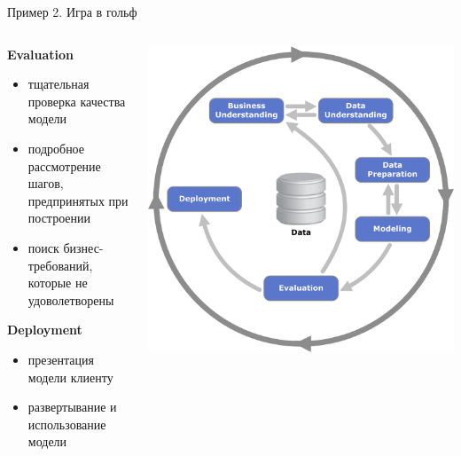 \documentclass[aspectratio=169]{beamer}
\begin{document}
\begin{frame}{Пример 2. Игра в гольф}

\begin{columns}
    \begin{column}{.7\textwidth}
		{\bf Evaluation}
		\begin{itemize}
		\item тщательная проверка качества модели
		\item подробное рассмотрение шагов, предпринятых при построении
		\item поиск бизнес-требований, которые не удоволетворены
		\end{itemize}
		
		\vspace{1em}

		{\bf Deployment}
		\begin{itemize}
		\item презентация модели клиенту
		\item развертывание и использование модели
		\end{itemize}
    \end{column}
    \begin{column}{.3\textwidth}
    \vspace{-0em}
		\begin{center}
   		\includegraphics[width=\textwidth]{images/crisp.png}
    \end{center}
    \end{column}
  \end{columns}

\end{frame}
\end{document}

